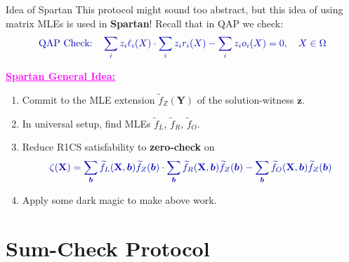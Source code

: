 \documentclass{zkdl-presentation-template}
\begin{document}
    \begin{frame}{Idea of Spartan}
        This protocol might sound too abstract, but this idea of using matrix
        MLEs is used in \textbf{Spartan}! Recall that in QAP we check:
        \begin{equation*}
            \textcolor{blue!70!black}{\text{QAP Check:} \quad \sum_{i}z_i\ell_i(X) \cdot \sum_{i}z_ir_i(X)- \sum_{i}z_io_i(X) = 0, \quad X \in \Omega}
        \end{equation*}

        \vspace{-12.5px}

        \pause\textcolor{magenta}{\underline{\textbf{Spartan General Idea:}}}
        \begin{enumerate}
            \item Commit to the MLE extension $\widetilde{f}_Z(\mathbf{Y})$ of the
            solution-witness $\mathbf{z}$.\pause
            \item In universal setup, find MLEs $\widetilde{f}_L$, $\widetilde{f}_R$, $\widetilde{f}_O$.\pause
            \item Reduce R1CS satisfability to \textbf{zero-check} on
            \begin{equation*}
                \textcolor{blue!70!black}{\zeta(\mathbf{X}) = \sum_{\boldsymbol{b}}\widetilde{f}_L(\mathbf{X},\boldsymbol{b})\widetilde{f}_Z(\boldsymbol{b}) \cdot \sum_{\boldsymbol{b}}\widetilde{f}_R(\mathbf{X},\boldsymbol{b})\widetilde{f}_Z(\boldsymbol{b}) - \sum_{\boldsymbol{b}}\widetilde{f}_O(\mathbf{X},\boldsymbol{b})\widetilde{f}_Z(\boldsymbol{b})}
            \end{equation*}
            \item \pause Apply some dark magic to make above work.
        \end{enumerate}
    \end{frame}

    \section{Sum-Check Protocol}
\end{document}
